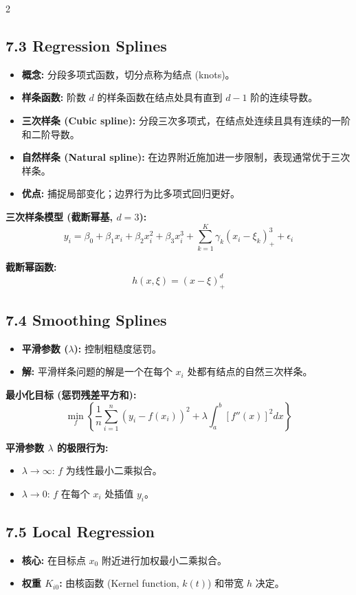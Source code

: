 \documentclass[6pt,a4paper]{ctexart}
\begin{document}
\begin{multicols}{2}
\subsection*{7.3 Regression Splines}
\begin{itemize}
    \item \textbf{概念:} 分段多项式函数，切分点称为结点 (knots)。
    \item \textbf{样条函数:} 阶数 $d$ 的样条函数在结点处具有直到 $d-1$ 阶的连续导数。
    \item \textbf{三次样条 (Cubic spline):} 分段三次多项式，在结点处连续且具有连续的一阶和二阶导数。
    \item \textbf{自然样条 (Natural spline):} 在边界附近施加进一步限制，表现通常优于三次样条。
    \item \textbf{优点:} 捕捉局部变化；边界行为比多项式回归更好。
\end{itemize}

\textbf{三次样条模型 (截断幂基, $d=3$):}
$$ y_{i}=\beta_{0}+\beta_{1}x_{i}+\beta_{2}x_{i}^{2}+\beta_{3}x_{i}^{3}+\sum_{k=1}^{K}\gamma_{k}(x_{i}-\xi_{k})_{+}^{3}+\epsilon_{i} $$

\textbf{截断幂函数:}
$$ h(x, \xi) = (x-\xi)_{+}^{d} $$

\subsection*{7.4 Smoothing Splines}
\begin{itemize}
    \item \textbf{平滑参数 ($\lambda$):} 控制粗糙度惩罚。
    \item \textbf{解:} 平滑样条问题的解是一个在每个 $x_i$ 处都有结点的自然三次样条。
\end{itemize}

\textbf{最小化目标 (惩罚残差平方和):}
$$ \min_{f}\left\{ \frac{1}{n} \sum_{i=1}^{n} (y_{i}-f(x_{i}))^{2} + \lambda \int_{a}^{b} [f''(x)]^{2} dx \right\} $$

\textbf{平滑参数 $\lambda$ 的极限行为:}
\begin{itemize}
    \item $\lambda \to \infty$: $f$ 为线性最小二乘拟合。
    \item $\lambda \to 0$: $f$ 在每个 $x_i$ 处插值 $y_i$。
\end{itemize}

\subsection*{7.5 Local Regression}
\begin{itemize}
    \item \textbf{核心:} 在目标点 $x_0$ 附近进行加权最小二乘拟合。
    \item \textbf{权重 $K_{i0}$:} 由核函数 (Kernel function, $k(t)$) 和带宽 $h$ 决定。
\end{itemize}


\end{multicols}
\end{document}
